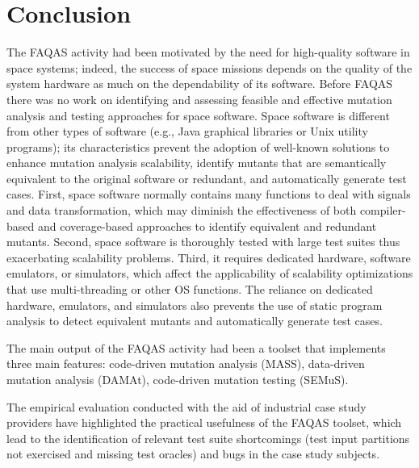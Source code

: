 
\section{Conclusion}
\label{sec:conclusion}

The FAQAS activity had been motivated by the need for high-quality software in space systems; indeed, the success of space missions depends on the quality of the system hardware as much on the dependability of its software. Before FAQAS there was no work on identifying and assessing feasible and effective mutation analysis and testing approaches for space software. Space software is different from other types of software (e.g., Java graphical libraries or Unix utility programs); its characteristics prevent the adoption of well-known solutions to enhance mutation analysis scalability, identify mutants that are semantically equivalent to the original software or redundant, and automatically generate test cases. First, space software normally contains many functions to deal with signals and data transformation, which may diminish the effectiveness of both compiler-based and coverage-based approaches to identify equivalent and redundant mutants. Second, space software is thoroughly tested with large test suites thus exacerbating scalability problems. Third, it requires dedicated hardware, software emulators, or simulators, which affect the applicability of scalability optimizations that use multi-threading or other OS functions. The reliance on dedicated hardware, emulators, and simulators also prevents the use of static program analysis to detect equivalent mutants and automatically generate test cases. 

The main output of the FAQAS activity had been a toolset that implements three main features: code-driven mutation analysis (MASS), data-driven mutation analysis (DAMAt), code-driven mutation testing (SEMuS).

The empirical evaluation conducted with the aid of industrial case study providers have highlighted the practical usefulness of the FAQAS toolset, which lead to the identification of relevant test suite shortcomings (test input partitions not exercised and missing test oracles) and bugs in the case study subjects.